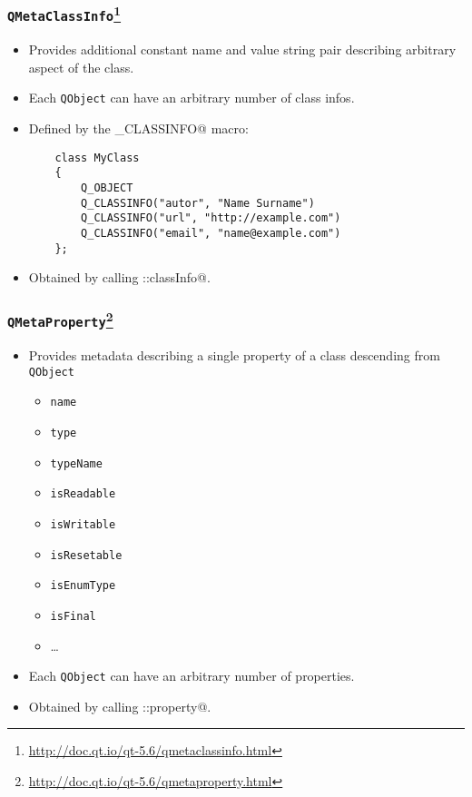\begin{frame}[fragile]
  \frametitle{\texttt{QMetaClassInfo}\footnote
    {\url{http://doc.qt.io/qt-5.6/qmetaclassinfo.html}}}
  \begin{itemize}
    \item Provides additional constant name and value string pair describing
      arbitrary aspect of the class.
    \item Each \texttt{QObject} can have an arbitrary number of class infos.
    \item Defined by the \verb@Q_CLASSINFO@ macro:
    \begin{verbatim}
	class MyClass
	{
	    Q_OBJECT
	    Q_CLASSINFO("autor", "Name Surname")
	    Q_CLASSINFO("url", "http://example.com")
	    Q_CLASSINFO("email", "name@example.com")
	};
    \end{verbatim}
    \item Obtained by calling \verb@QMetaObject::classInfo@.
  \end{itemize}
\end{frame}

\begin{frame}[fragile]
  \frametitle{\texttt{QMetaProperty}\footnote
    {\url{http://doc.qt.io/qt-5.6/qmetaproperty.html}}}
  \begin{itemize}
    \item Provides metadata describing a single property of a class descending
     from \texttt{QObject}
     \begin{itemize}
       \item \texttt{name}
       \item \texttt{type}
       \item \texttt{typeName}
       \item \texttt{isReadable}
       \item \texttt{isWritable}
       \item \texttt{isResetable}
       \item \texttt{isEnumType}
       \item \texttt{isFinal}
       \item \ldots
     \end{itemize}
    \item Each \texttt{QObject} can have an arbitrary number of properties.
    \item Obtained by calling \verb@QMetaObject::property@.
  \end{itemize}
\end{frame}


